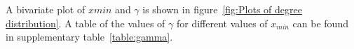 A bivariate plot of $x min$ and $\gamma$ is shown in figure~\ref{fig:Plots of degree distribution}. A table of the values of $\gamma$ for different values of $x_{min}$ can be found in supplementary table~\ref{table:gamma}.




